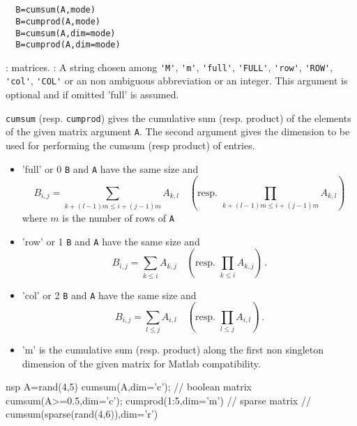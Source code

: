 \begin{mandesc}
  \\ %
  \\ %
\end{mandesc}
\begin{calling_sequence}
\begin{verbatim}
  B=cumsum(A,mode)  
  B=cumprod(A,mode)  
  B=cumsum(A,dim=mode) 
  B=cumprod(A,dim=mode)  
\end{verbatim}
\end{calling_sequence}
\begin{parameters}
  \begin{varlist}
    : matrices.
    : A string chosen among \verb+'M'+, \verb+'m'+, \verb+'full'+, \verb+'FULL'+, \verb+'row'+,
    \verb+'ROW'+, \verb+'col'+, \verb+'COL'+ or an non ambiguous abbreviation or an integer. 
    This argument is optional and if omitted 'full' is assumed.
  \end{varlist}
\end{parameters}
\begin{mandescription}
  \verb+cumsum+ (resp. \verb+cumprod+) gives the cumulative sum (resp. product) of the 
  elements of the given matrix argument \verb+A+. 
  The second argument gives the dimension to be used for performing the cumsum (resp product) of entries.       
  \begin{itemize}
  \item 'full' or 0 \verb+B+ and \verb+A+ have the same size and 
    $$B_{i,j} = \sum_{k+(l-1)m \le i+(j-1)m } A_{k,l} \quad \left( \text{resp. } \prod_{k+(l-1)m \le i+(j-1)m } A_{k,l} \right)$$ 
    where $m$ is the number of rows of \verb+A+
  \item 'row' or 1  \verb+B+ and \verb+A+ have the same size and 
    $$B_{i,j} = \sum_{k\le i} A_{k,j}\quad \left(\text{resp. }  \prod_{k\le i} A_{k,j}\right) \,. $$     
  \item 'col' or 2  \verb+B+ and \verb+A+ have the same size and 
    $$B_{i,j} = \sum_{l\le j} A_{i,l} \quad \left(\text{resp. }  \prod_{l\le j} A_{i,l}  \right) \,. $$     
  \item 'm' is the cumulative sum (resp. product) along the first non singleton dimension of the given matrix 
    for Matlab compatibility. 
  \end{itemize}
\end{mandescription}
\begin{examples}
  \begin{mintednsp}{nsp}
    A=rand(4,5) 
    cumsum(A,dim='c'); 
    // boolean matrix 
    cumsum(A>=0.5,dim='c');
    cumprod(1:5,dim='m') 
    // sparse matrix 
    // cumsum(sparse(rand(4,6)),dim='r')
  \end{mintednsp}
\end{examples}
\begin{manseealso}
     
\end{manseealso}

